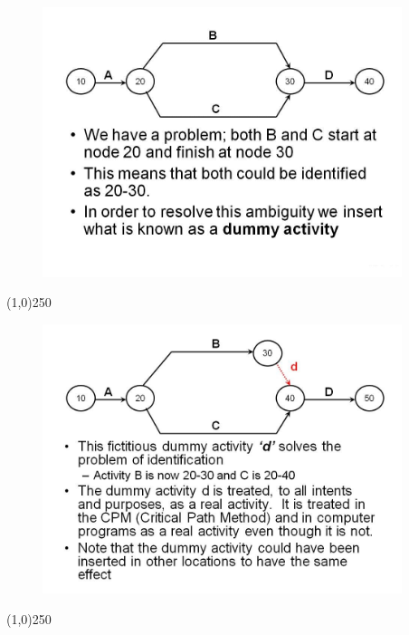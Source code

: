 \begin{frame}
\begin{figure}
	\centering
		\includegraphics[width = 10.5cm]{oldnotes/Slide51.jpg}
\end{figure}
\end{frame}
\begin{center}\line(1,0){250}\end{center}





\begin{frame}
\begin{figure}
	\centering
		\includegraphics[width = 10.5cm]{oldnotes/Slide52.jpg}
\end{figure}
\end{frame}
\begin{center}\line(1,0){250}\end{center}





